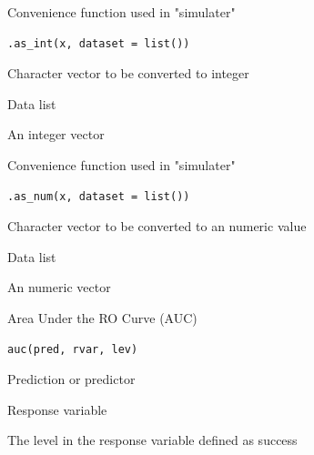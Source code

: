 \documentclass[a4paper]{book}
\begin{document}
%
\begin{Description}
Convenience function used in "simulater"
\end{Description}
%
\begin{Usage}
\begin{verbatim}
.as_int(x, dataset = list())
\end{verbatim}
\end{Usage}
%
\begin{Arguments}
\begin{ldescription}
\item[\code{x}] Character vector to be converted to integer

\item[\code{dataset}] Data list
\end{ldescription}
\end{Arguments}
%
\begin{Value}
An integer vector
\end{Value}
%
\begin{Description}
Convenience function used in "simulater"
\end{Description}
%
\begin{Usage}
\begin{verbatim}
.as_num(x, dataset = list())
\end{verbatim}
\end{Usage}
%
\begin{Arguments}
\begin{ldescription}
\item[\code{x}] Character vector to be converted to an numeric value

\item[\code{dataset}] Data list
\end{ldescription}
\end{Arguments}
%
\begin{Value}
An numeric vector
\end{Value}
%
\begin{Description}
Area Under the RO Curve (AUC)
\end{Description}
%
\begin{Usage}
\begin{verbatim}
auc(pred, rvar, lev)
\end{verbatim}
\end{Usage}
%
\begin{Arguments}
\begin{ldescription}
\item[\code{pred}] Prediction or predictor

\item[\code{rvar}] Response variable

\item[\code{lev}] The level in the response variable defined as success
\end{ldescription}
\end{Arguments}
\end{document}
